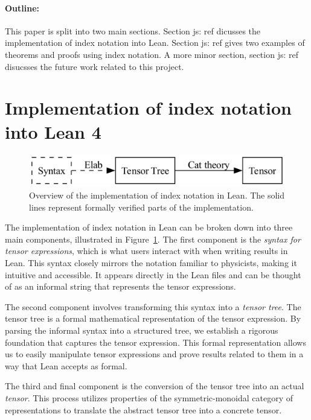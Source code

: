 \documentclass[a4paper, 11pt]{article}
\newcommand{\js}[1]{ {\color{magenta} js:  #1}}
\begin{document}
\paragraph{Outline:} This paper is split into two main sections. Section \js{ref} dicusses 
the implementation of index notation into Lean. Section \js{ref} gives two examples 
of theorems and proofs using index notation. A more minor section, section \js{ref} disucsses 
the future work related to this project.


\section{Implementation of index notation into Lean 4}
\begin{figure}
  \centering
  \includegraphics[width=\textwidth]{overviewFlow.png}
  \caption{Overview of the implementation of index notation in Lean. The 
  solid lines represent formally verified parts of the implementation.}
  \label{fig:overviewFlow}
\end{figure}
The implementation of index notation in Lean can be  broken down into 
three main components, illustrated in Figure~\ref{fig:overviewFlow}. 
The first component is the \emph{syntax for tensor expressions}, 
which is what users interact with when writing results in Lean. 
This syntax closely mirrors the notation familiar to physicists, 
making it intuitive and accessible. 
It appears directly in the Lean files and can be thought of as an informal string 
that represents the tensor expressions.

The second component involves transforming this syntax into a \emph{tensor tree}. 
The tensor tree is a formal mathematical representation of the tensor expression. 
By parsing the informal syntax into a structured tree, 
we establish a rigorous foundation that captures the tensor expression. 
This formal representation allows us to easily manipulate tensor expressions and
prove results related to them in a way that Lean accepts as formal.

The third and final component is the conversion of the tensor tree into an actual \emph{tensor}. 
This process utilizes properties of the symmetric-monoidal category of representations
 to translate the abstract tensor tree into a concrete tensor.
\end{document}
